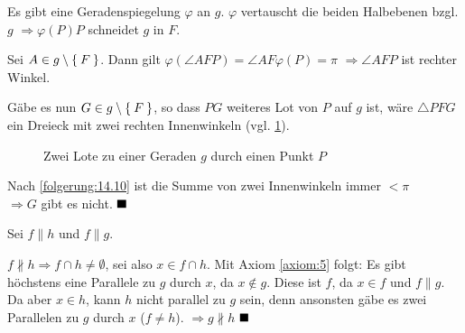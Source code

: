 \begin{solution}[\ref{ub11:aufg3}]
\begin{enumerate}[label=(\alph*)]
              Es gibt eine Geradenspiegelung $\varphi$ an $g$.
              $\varphi$ vertauscht die beiden Halbebenen bzgl. $g$
              $\Rightarrow \varphi(P)P$ schneidet $g$ in $F$.

              Sei $A \in g \setminus \Set{F}$. Dann gilt $\varphi(\angle AFP) = \angle AF \varphi(P) = \pi$
              $\Rightarrow \angle AFP$ ist rechter Winkel.

              Gäbe es nun $G \in g \setminus \Set{F}$, so dass $PG$ weiteres Lot von $P$ auf $g$ ist,
              wäre $\triangle PFG$ ein Dreieck mit zwei rechten Innenwinkeln (vgl. \cref{fig:two-perpendiculars}).

              \begin{figure}[htp]
                  \centering
                  
                  \caption{Zwei Lote zu einer Geraden $g$ durch einen Punkt $P$}
                  \label{fig:two-perpendiculars}
              \end{figure}

              Nach \cref{folgerung:14.10} ist die Summe von zwei Innenwinkeln immer $< \pi$\\
              $\Rightarrow G$ gibt es nicht. $\qed$
    \end{enumerate}
\end{solution}

\begin{solution}[\ref{ub-tut-24:a1}]
    Sei $f \parallel h$ und \obda $f \parallel g$.

    $f \nparallel h \Rightarrow f \cap h \neq \emptyset$, sei also $x \in f \cap h$.
    Mit Axiom \ref{axiom:5} folgt: Es gibt höchstens eine Parallele
    zu $g$ durch $x$, da $x \notin g$. Diese ist $f$, da $x \in f$
    und $f \parallel g$. Da aber $x \in h$, kann $h$ nicht parallel
    zu $g$ sein, denn ansonsten gäbe es zwei Parallelen zu $g$ durch
    $x$ ($f \neq h$).
    $\Rightarrow g \nparallel h$ $\qed$
\end{solution}

